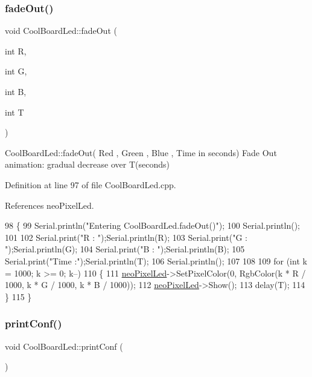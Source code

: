 \subsubsection{\texorpdfstring{fade\+Out()}{fadeOut()}}
{\footnotesize\ttfamily void Cool\+Board\+Led\+::fade\+Out (\begin{DoxyParamCaption}\item[{int}]{R,  }\item[{int}]{G,  }\item[{int}]{B,  }\item[{int}]{T }\end{DoxyParamCaption})}

Cool\+Board\+Led\+::fade\+Out( Red , Green , Blue , Time in seconds) Fade Out animation\+: gradual decrease over T(seconds) 

Definition at line 97 of file Cool\+Board\+Led.\+cpp.



References neo\+Pixel\+Led.


\begin{DoxyCode}
98 \{
99     Serial.println(\textcolor{stringliteral}{"Entering CoolBoardLed.fadeOut()"});
100     Serial.println();
101 
102     Serial.print(\textcolor{stringliteral}{"R : "});Serial.println(R);
103     Serial.print(\textcolor{stringliteral}{"G : "});Serial.println(G);
104     Serial.print(\textcolor{stringliteral}{"B : "});Serial.println(B);
105     Serial.print(\textcolor{stringliteral}{"Time :"});Serial.println(T);
106     Serial.println();   
107 
108 
109     \textcolor{keywordflow}{for} (\textcolor{keywordtype}{int} k = 1000; k >= 0; k--) 
110     \{
111         \hyperlink{classCoolBoardLed_ac2c13fa462a010cd9242bf297c013923}{neoPixelLed}->SetPixelColor(0, RgbColor(k * R / 1000, k * G / 1000, k * B / 1000));
112         \hyperlink{classCoolBoardLed_ac2c13fa462a010cd9242bf297c013923}{neoPixelLed}->Show();
113         delay(T);
114     \}
115 \}
\end{DoxyCode}
\mbox{\label{classCoolBoardLed_a8ed3053a36f0ed4a131f43b5b17efb61}} 
\subsubsection{\texorpdfstring{print\+Conf()}{printConf()}}
{\footnotesize\ttfamily void Cool\+Board\+Led\+::print\+Conf (\begin{DoxyParamCaption}{ }\end{DoxyParamCaption})}


